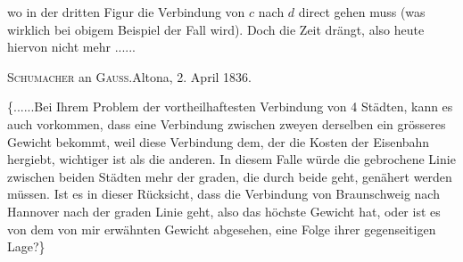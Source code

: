 \clearpage{}
\noindent wo in der dritten Figur die Verbindung von \(c\) nach \(d\) direct gehen muss (was wirklich bei obigem Beispiel der Fall wird). Doch die Zeit drängt, also heute hiervon nicht mehr .\enspace.\enspace.\enspace.\enspace.\enspace.

\begin{center}\textsc{Schumacher} an \textsc{Gauss}.\quad Altona, 2. April 1836.\end{center}
\indent \{.\enspace.\enspace.\enspace.\enspace.\enspace.\quad Bei Ihrem Problem der vortheilhaftesten Verbindung von 4 Städten, kann es auch vorkommen, dass eine Verbindung zwischen zweyen derselben ein grösseres Gewicht bekommt, weil diese Verbindung dem, der die Kosten der Eisenbahn hergiebt, wichtiger ist als die anderen. In diesem Falle würde die gebrochene Linie zwischen beiden Städten mehr der graden, die durch beide geht, genähert werden müssen. Ist es in dieser Rücksicht, dass die Verbindung von Braunschweig nach Hannover nach der graden Linie geht, also das höchste Gewicht hat, oder ist es von dem von mir erwähnten Gewicht abgesehen, eine Folge ihrer gegenseitigen Lage?\}

